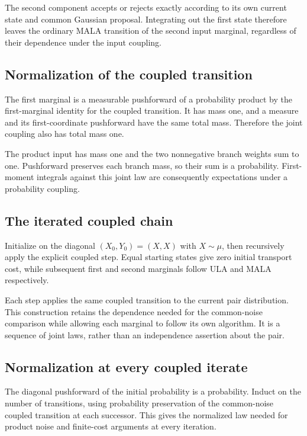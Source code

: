 \documentclass[11pt,a4paper]{article}
\begin{document}
The second component accepts or rejects exactly according to its own current state and common Gaussian proposal. Integrating out the first state therefore leaves the ordinary MALA transition of the second input marginal, regardless of their dependence under the input coupling.


\subsection{\texorpdfstring{Normalization of the coupled transition}{Normalization of the coupled transition}}


The first marginal is a measurable pushforward of a probability product by the first-marginal identity for the coupled transition. It has mass one, and a measure and its first-coordinate pushforward have the same total mass. Therefore the joint coupling also has total mass one.



The product input has mass one and the two nonnegative branch weights sum to one. Pushforward preserves each branch mass, so their sum is a probability. First-moment integrals against this joint law are consequently expectations under a probability coupling.


\subsection{\texorpdfstring{The iterated coupled chain}{The iterated coupled chain}}


Initialize on the diagonal \((X_0,Y_0)=(X,X)\) with \(X\sim\mu\), then recursively apply the explicit coupled step. Equal starting states give zero initial transport cost, while subsequent first and second marginals follow ULA and MALA respectively.



Each step applies the same coupled transition to the current pair distribution. This construction retains the dependence needed for the common-noise comparison while allowing each marginal to follow its own algorithm. It is a sequence of joint laws, rather than an independence assertion about the pair.


\subsection{\texorpdfstring{Normalization at every coupled iterate}{Normalization at every coupled iterate}}


The diagonal pushforward of the initial probability is a probability. Induct on the number of transitions, using probability preservation of the common-noise coupled transition at each successor. This gives the normalized law needed for product noise and finite-cost arguments at every iteration.
\end{document}
